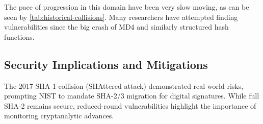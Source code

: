 \documentclass[a4paper]{report}
\begin{document}
\begin{table}[H]
\centering
{}
\caption{Historical SHA-256 and SHA-512 collisions from 2008 to present, including this paper's SHA-256 results for reference.}
\label{tab:historical-collisions}
\end{table}

The pace of progression in this domain have been very slow moving, as can be seen by \ref{tab:historical-collisions}.
Many researchers have attempted finding vulnerabilities since the big crash of MD4 and similarly structured hash functions. \cite{xiaoyun_2004}

\subsection{Security Implications and Mitigations}
The 2017 SHA-1 collision (SHAttered attack) \cite{marc_2017} demonstrated real-world risks, prompting NIST to mandate SHA-2/3 migration for digital signatures.
While full SHA-2 remains secure, reduced-round vulnerabilities highlight the importance of monitoring cryptanalytic advances.
\end{document}
